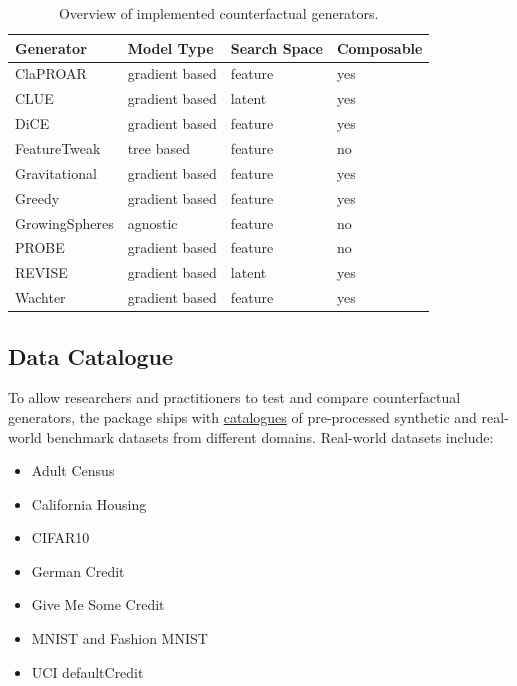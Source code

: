 \documentclass[
  letterpaper,
  DIV=11,
  numbers=noendperiod]{scrartcl}
\begin{document}
\begin{table}
\caption{Overview of implemented counterfactual generators. \label{tab-gen} \newline}
\centering
\fontsize{7}{9}\selectfont
\begin{tabular}[t]{llll}
\toprule
Generator & Model Type & Search Space & Composable\\
\midrule
ClaPROAR \cite{altmeyer2023endogenous} & gradient based & feature & yes\\
CLUE \cite{antoran2020getting} & gradient based & latent & yes\\
DiCE \cite{mothilal2020explaining} & gradient based & feature & yes\\
FeatureTweak \cite{tolomei2017interpretable} & tree based & feature & no\\
Gravitational \cite{altmeyer2023endogenous} & gradient based & feature & yes\\
Greedy \cite{schut2021generating} & gradient based & feature & yes\\
GrowingSpheres \cite{laugel2017inversea} & agnostic & feature & no\\
PROBE \cite{pawelczyk2022probabilistically} & gradient based & feature & no\\
REVISE \cite{joshi2019realistic} & gradient based & latent & yes\\
Wachter \cite{wachter2017counterfactual} & gradient based & feature & yes\\
\bottomrule
\end{tabular}
\end{table}

\hypertarget{data-catalogue}{%
\subsection{Data Catalogue}\label{data-catalogue}}

To allow researchers and practitioners to test and compare
counterfactual generators, the package ships with
\href{https://juliatrustworthyai.github.io/CounterfactualExplanations.jl/v0.1/tutorials/data_catalogue/}{catalogues}
of pre-processed synthetic and real-world benchmark datasets from
different domains. Real-world datasets include:

\begin{itemize}
\item Adult Census \cite{becker1996adult}
\item California Housing \cite{pace1997sparse}
\item CIFAR10 \cite{krizhevsky2009learning}
\item German Credit \cite{hoffman1994german}
\item Give Me Some Credit \cite{kaggle2011give}
\item MNIST \cite{lecun1998mnist} and Fashion MNIST \cite{xiao2017fashion}
\item UCI defaultCredit \cite{yeh2009comparisons}
\end{itemize}
\end{document}
